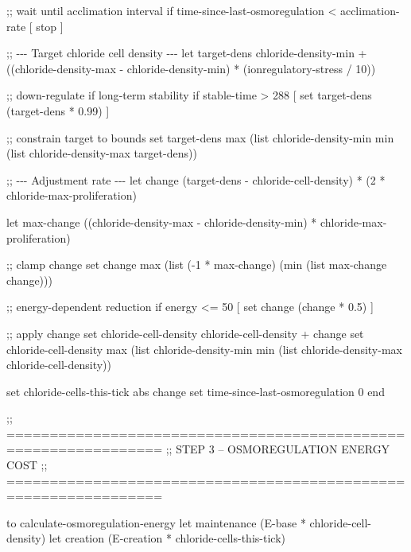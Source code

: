 \documentclass[
]{book}
\newenvironment{Shaded}{\begin{snugshade}}{\end{snugshade}}
\newcommand{\NormalTok}[1]{#1}
\begin{document}
\begin{Shaded}
\begin{Highlighting}[]
\NormalTok{  ;; wait until acclimation interval}
\NormalTok{  if time{-}since{-}last{-}osmoregulation \textless{} acclimation{-}rate [ stop ]}

\NormalTok{  ;; {-}{-}{-} Target chloride cell density {-}{-}{-}}
\NormalTok{  let target{-}dens chloride{-}density{-}min +}
\NormalTok{    ((chloride{-}density{-}max {-} chloride{-}density{-}min) *}
\NormalTok{     (ionregulatory{-}stress / 10))}

\NormalTok{  ;; down{-}regulate if long{-}term stability}
\NormalTok{  if stable{-}time \textgreater{} 288 [}
\NormalTok{    set target{-}dens (target{-}dens * 0.99)}
\NormalTok{  ]}

\NormalTok{  ;; constrain target to bounds}
\NormalTok{  set target{-}dens max (list chloride{-}density{-}min}
\NormalTok{                       min (list chloride{-}density{-}max target{-}dens))}

\NormalTok{  ;; {-}{-}{-} Adjustment rate {-}{-}{-}}
\NormalTok{  let change (target{-}dens {-} chloride{-}cell{-}density) *}
\NormalTok{             (2 * chloride{-}max{-}proliferation)}

\NormalTok{  let max{-}change ((chloride{-}density{-}max {-} chloride{-}density{-}min) *}
\NormalTok{                   chloride{-}max{-}proliferation)}

\NormalTok{  ;; clamp change}
\NormalTok{  set change max (list ({-}1 * max{-}change) (min (list max{-}change change)))}

\NormalTok{  ;; energy{-}dependent reduction}
\NormalTok{  if energy \textless{}= 50 [}
\NormalTok{    set change (change * 0.5)}
\NormalTok{  ]}

\NormalTok{  ;; apply change}
\NormalTok{  set chloride{-}cell{-}density chloride{-}cell{-}density + change}
\NormalTok{  set chloride{-}cell{-}density max (list chloride{-}density{-}min}
\NormalTok{                                  min (list chloride{-}density{-}max chloride{-}cell{-}density))}

\NormalTok{  set chloride{-}cells{-}this{-}tick abs change}
\NormalTok{  set time{-}since{-}last{-}osmoregulation 0}
\NormalTok{end}


\NormalTok{;; ================================================================}
\NormalTok{;; STEP 3 – OSMOREGULATION ENERGY COST}
\NormalTok{;; ================================================================}

\NormalTok{to calculate{-}osmoregulation{-}energy}
\NormalTok{  let maintenance (E{-}base * chloride{-}cell{-}density)}
\NormalTok{  let creation    (E{-}creation * chloride{-}cells{-}this{-}tick)}


\end{Highlighting}
\end{Shaded}
\end{document}
